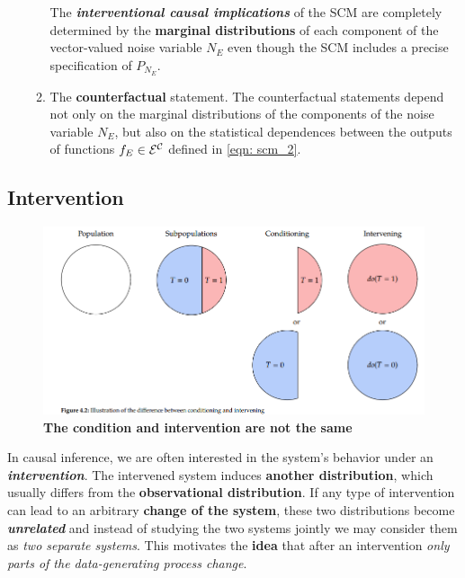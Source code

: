 \documentclass[11pt]{article}
\begin{document}
\begin{itemize}
\begin{enumerate}
The \emph{\textbf{interventional causal implications}} of the SCM are completely determined by the \textbf{marginal distributions} of each component of the vector-valued noise variable $N_E$ even though the SCM includes a precise specification of $P_{N_E}$. 

\item The \textbf{counterfactual} statement. The counterfactual statements depend not only on the marginal distributions of the components of the
noise variable $N_E$, but also on the statistical dependences between the outputs of functions $f_{E} \in {\mathcal E}^{{\mathcal C}}$  defined in \eqref{eqn: scm_2}.
\end{enumerate}


\end{itemize}


\subsection{Intervention}
\begin{figure}
\begin{minipage}[t]{1\linewidth}
  \centering
  \centerline{\includegraphics[scale = 0.5]{intervention_condition.png}}
\end{minipage}
\caption{\footnotesize{\textbf{The condition and intervention are not the same  \citep{neal2020introduction}}}}
\label{fig: intervention_condition}
\end{figure}
In causal inference, we are often interested in the system’s behavior under an \emph{\textbf{intervention}}. The intervened system induces \textbf{another distribution}, which usually differs from the \textbf{observational distribution}. If any type of intervention can lead to an arbitrary \textbf{change of the system}, these two distributions become \emph{\textbf{unrelated}} and instead of studying the two systems jointly we may consider them as \emph{two separate systems}. This motivates the \textbf{idea} that after an intervention \emph{only parts of the data-generating process change}. 
\end{document}
